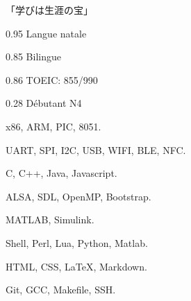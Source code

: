 \documentclass{faresume}
\begin{document}
\begin{column}[\rightcolumnwidth]


		\addcontent
		{
			{\Large\begin{CJK}{UTF8}{min}「学びは生涯の宝」\end{CJK}}
		}{}{}{}{}


		{}{}{}{}

		{}{}{}{}

		{}{}{}{}

		{}{}{}{}

		{}{}{}{}


			{0.95}
			{Langue natale}
			{}{}{}

			{0.85}
			{Bilingue}
			{}{}{}

			{0.86}
			{TOEIC: 855/990}
			{}{}{}

			{0.28}
			{D\'ebutant N4}
			{}{}{}


			{x86, ARM, PIC, 8051.}
			{}{}{}{}

			{UART, SPI, I2C, USB, WIFI, BLE, NFC.}
			{}{}{}{}

			{C, C++, Java, Javascript.}
			{}{}{}{}

			{ALSA, SDL, OpenMP, Bootstrap.}
			{}{}{}{}

			{MATLAB, Simulink.}
			{}{}{}{}

			{Shell, Perl, Lua, Python, Matlab.}
			{}{}{}{}

			{HTML, CSS, {\LaTeX}, Markdown.}
			{}{}{}{}

			{Git, GCC, Makefile, SSH.}
			{}{}{}{}


\end{column}
\end{document}
